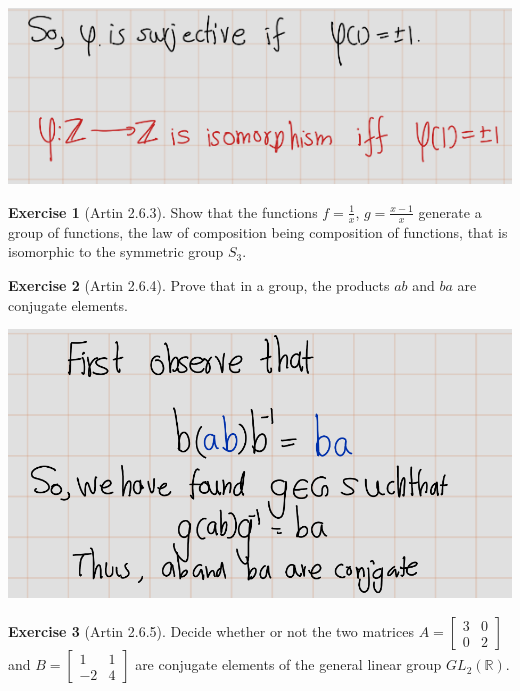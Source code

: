 \documentclass[
]{book}
\theoremstyle{definition}
\theoremstyle{definition}
\theoremstyle{definition}
\newtheorem{exercise}{Exercise}[chapter]
\theoremstyle{definition}
\theoremstyle{remark}
\begin{document}
\includegraphics{figures/ch_2/fig81.png}

\begin{exercise}[Artin 2.6.3]
\protect\hypertarget{exr:unnamed-chunk-131}{}\label{exr:unnamed-chunk-131}Show that the functions \(f = \frac{1}{x}\), \(g = \frac{x - 1}{x}\) generate a group of functions, the law of composition being composition of functions, that is isomorphic to the symmetric group \(S_3\).
\end{exercise}

\begin{exercise}[Artin 2.6.4]
\protect\hypertarget{exr:unnamed-chunk-132}{}\label{exr:unnamed-chunk-132}Prove that in a group, the products \(ab\) and \(ba\) are conjugate elements.
\end{exercise}

\includegraphics{figures/ch_2/fig82.png}

\begin{exercise}[Artin 2.6.5]
\protect\hypertarget{exr:unnamed-chunk-134}{}\label{exr:unnamed-chunk-134}Decide whether or not the two matrices \(A = \begin{bmatrix} 3 & 0 \\ 0 & 2 \end{bmatrix}\) and \(B = \begin{bmatrix} 1 & 1 \\ -2 & 4 \end{bmatrix}\) are conjugate elements of the general linear group \(GL_2(\mathbb{R})\).
\end{exercise}
\end{document}
